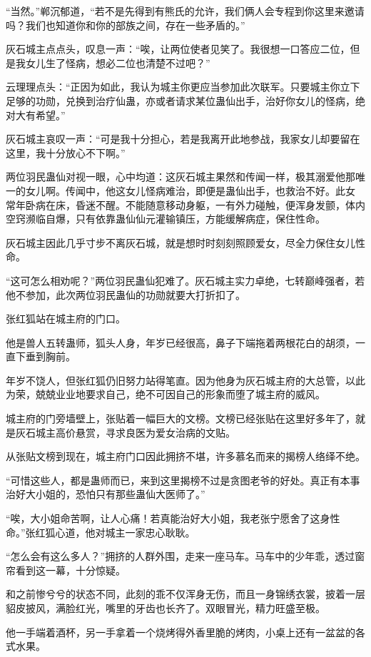 \begin{this_body}
“当然。”郸沉郁道，“若不是先得到有熊氏的允许，我们俩人会专程到你这里来邀请吗？我们也知道你和你的部族之间，存在一些矛盾的。”

灰石城主点点头，叹息一声：“唉，让两位使者见笑了。我很想一口答应二位，但是我女儿生了怪病，想必二位也清楚不过吧？”

云理理点头：“正因为如此，我认为城主你更应当参加此次联军。只要城主你立下足够的功勋，兑换到治疗仙蛊，亦或者请求某位蛊仙出手，治好你女儿的怪病，绝对大有希望。”

灰石城主哀叹一声：“可是我十分担心，若是我离开此地参战，我家女儿却要留在这里，我十分放心不下啊。”

两位羽民蛊仙对视一眼，心中均道：这灰石城主果然和传闻一样，极其溺爱他那唯一的女儿啊。传闻中，他这女儿怪病难治，即便是蛊仙出手，也救治不好。此女 常年卧病在床，昏迷不醒。不能随意移动身躯，一有外力碰触，便浑身发颤，体内空窍濒临自爆，只有依靠蛊仙仙元灌输镇压，方能缓解病症，保住性命。

灰石城主因此几乎寸步不离灰石城，就是想时时刻刻照顾爱女，尽全力保住女儿性命。

“这可怎么相劝呢？”两位羽民蛊仙犯难了。灰石城主实力卓绝，七转巅峰强者，若他不参加，此次两位羽民蛊仙的功勋就要大打折扣了。

张红狐站在城主府的门口。

他是兽人五转蛊师，狐头人身，年岁已经很高，鼻子下端拖着两根花白的胡须，一直下垂到胸前。

年岁不饶人，但张红狐仍旧努力站得笔直。因为他身为灰石城主府的大总管，以此为荣，兢兢业业地要求自己，绝不可因自己的形象而堕了城主府的威风。

城主府的门旁墙壁上，张贴着一幅巨大的文榜。文榜已经张贴在这里好多年了，就是灰石城主高价悬赏，寻求良医为爱女治病的文贴。

从张贴文榜到现在，城主府门口因此拥挤不堪，许多慕名而来的揭榜人络绎不绝。

“可惜这些人，都是蛊师而已，来到这里揭榜不过是贪图老爷的好处。真正有本事治好大小姐的，恐怕只有那些蛊仙大医师了。”

“唉，大小姐命苦啊，让人心痛！若真能治好大小姐，我老张宁愿舍了这身性命。”张红狐心道，他对城主一家忠心耿耿。

“怎么会有这么多人？”拥挤的人群外围，走来一座马车。马车中的少年乖，透过窗帘看到这一幕，十分惊疑。

和之前惨兮兮的状态不同，此刻的乖不仅浑身无伤，而且一身锦绣衣裳，披着一层貂皮披风，满脸红光，嘴里的牙齿也长齐了。双眼冒光，精力旺盛至极。

他一手端着酒杯，另一手拿着一个烧烤得外香里脆的烤肉，小桌上还有一盆盆的各式水果。


\end{this_body}
